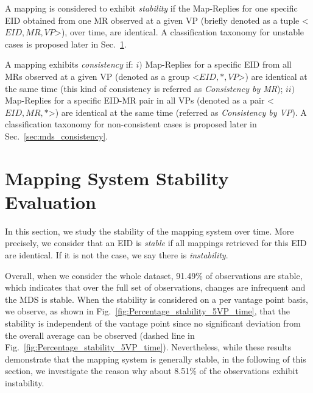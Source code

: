 A mapping is considered to exhibit \textit{stability} if the Map-Replies for one specific EID obtained from one MR observed at a given VP (briefly denoted as a tuple {<$EID, MR, VP$>}), over time, are identical. A classification taxonomy for unstable cases is proposed later in Sec.~\ref{sec:mds_stability}. 

A mapping exhibits \textit{consistency} if: $i)$ Map-Replies for a specific EID from all MRs observed at a given VP (denoted as a group {<$ EID, *, VP $>}) are identical at the same time (this kind of consistency is referred as \emph{Consistency by MR}); $ii)$ Map-Replies for a specific EID-MR pair in all VPs (denoted as a pair {<$ EID, MR, * $>}) are identical at the same time (referred as \emph{Consistency by VP}). A classification taxonomy for non-consistent cases is proposed later in Sec.~\ref{sec:mds_consistency}. 


\section{Mapping System Stability Evaluation}
\label{sec:mds_stability}

In this section, we study the stability of the mapping system over time. More precisely, we consider that an EID is \emph{stable} if all mappings retrieved for this EID are identical. If it is not the case, we say there is \emph{instability}.

Overall, when we consider the whole dataset, 91.49\% of observations are stable, which indicates that over the full set of observations, changes are infrequent and the MDS is stable. When the stability is considered on a per vantage point basis, we observe, as shown in Fig.~\ref{fig:Percentage_stability_5VP_time}, that the stability is independent of the vantage point since no significant deviation from the overall average can be observed (dashed line in Fig.~\ref{fig:Percentage_stability_5VP_time}). Nevertheless, while these results demonstrate that the mapping system is generally stable, in the following of this section, we investigate the reason why about 8.51\% of the observations exhibit instability.

